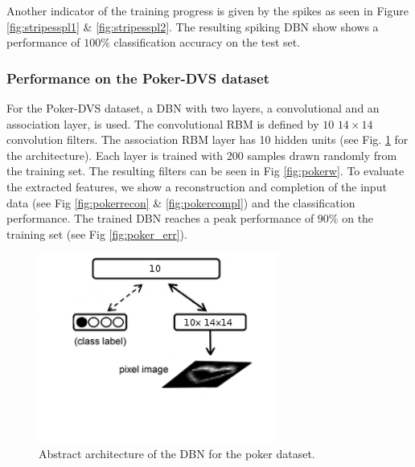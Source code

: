 Another indicator of the training progress is given by the spikes as seen in Figure \ref{fig:stripesspl1} \& \ref{fig:stripesspl2}.
The resulting spiking DBN show shows a performance of $100 \%$ classification accuracy on the test set. 


\subsubsection{Performance on the Poker-DVS dataset} \label{c:pokerexp}

For the Poker-DVS dataset, a DBN with two layers, a convolutional and an association layer, is used.
The convolutional RBM is defined by $10$ $14 \times 14$ convolution filters.
The association RBM layer has 10 hidden units (see Fig. \ref{fig:pokerdbnarch} for the architecture).
Each layer is trained with $200$ samples drawn randomly from the training set.
The resulting filters can be seen in Fig \ref{fig:pokerw}.
To evaluate the extracted features, we show a reconstruction and completion of the input data (see Fig \ref{fig:pokerrecon} \& \ref{fig:pokercompl}) and the classification performance. 
The trained DBN reaches a peak performance of $90 \%$ on the training set (see Fig \ref{fig:poker_err}).


\begin{figure}[h!]
	\centering
    	\includegraphics[width=0.7\textwidth]{imgs/poker/dbn_poker.png} 
    \caption{Abstract architecture of the DBN for the poker dataset.}
	\label{fig:pokerdbnarch}
\end{figure}

